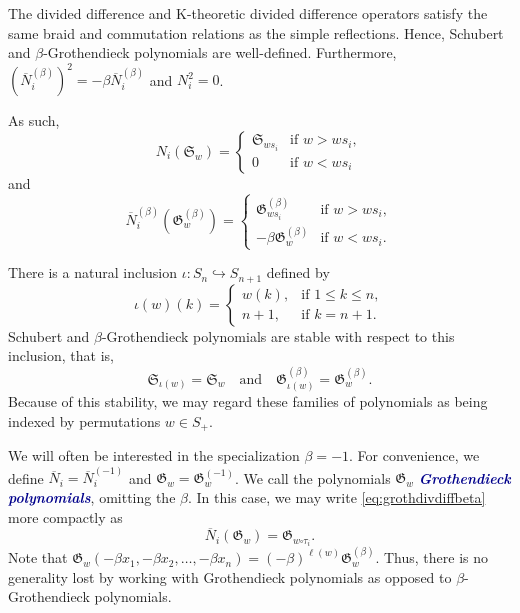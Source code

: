 \documentclass[12 pt]{amsart}
\newcommand{\newword}[1]{\textcolor{darkblue}{\textbf{\emph{#1}}}}
\numberwithin{equation}{section}
\theoremstyle{remark}
\newcommand{\divdiff}{N}
\newcommand{\kdivdiff}{\overline{N}}
\begin{document}
	The divided difference and K-theoretic divided difference operators satisfy the same braid and commutation relations as the simple reflections. 
	Hence, Schubert and $\beta$-Grothendieck polynomials are well-defined. 
	Furthermore, $\left(\kdivdiff_i^{(\beta)}\right)^2 = -\beta \kdivdiff_i^{(\beta)}$ and $\divdiff_i^2 = 0$.
	
	As such,
	\begin{equation}\label{eq:shubdivdiff}
		\divdiff_i(\mathfrak{S}_w) = 
		\begin{cases}
			\mathfrak{S}_{ws_i} &\text{if } w > ws_i, \\
			0 &\text {if } w < ws_i
		\end{cases}
	\end{equation}
	and
	\begin{equation}\label{eq:grothdivdiffbeta}
		\kdivdiff^{(\beta)}_i(\mathfrak{G}^{(\beta)}_w) = 
		\begin{cases}
			\mathfrak{G}^{(\beta)}_{ws_i} &\text{if } w > ws_i, \\
			-\beta \mathfrak{G}^{(\beta)}_{w} &\text {if } w < ws_i.
		\end{cases}
	\end{equation}


	

	
	There is a natural inclusion $\iota:S_n \hookrightarrow S_{n + 1}$ defined by 
	\[
	\iota(w)(k) = 
	\begin{cases}
	w(k), & \text{if } 1 \leq k \leq n, \\
	n + 1, & \text{if } k = n + 1.
	\end{cases}
	\]
	Schubert and $\beta$-Grothendieck polynomials are stable with respect to this inclusion, that is,
	\[
	\mathfrak{S}_{\iota(w)} = \mathfrak{S}_w
	\quad \text{and} \quad
	\mathfrak{G}^{(\beta)}_{\iota(w)} = \mathfrak{G}^{(\beta)}_w.
	\]
	Because of this stability, we may regard these families of polynomials as being indexed by permutations $w \in S_{+}$. 
	
	We will often be interested in the specialization $\beta = -1$. 
	For convenience, we define $\kdivdiff_i = \kdivdiff^{(-1)}_i$ and $\mathfrak{G}_w = \mathfrak{G}^{(-1)}_w$. 
	We call the polynomials $\mathfrak{G}_w$ \newword{Grothendieck polynomials}, omitting the $\beta$.
	In this case, we may write \cref{eq:grothdivdiffbeta} more compactly as
	\begin{equation}\label{eq:grothdivdiff}
		\kdivdiff_i(\mathfrak{G}_w) = \mathfrak{G}_{w \square \tau_i}.
	\end{equation}
	Note that $\mathfrak G_w(-\beta x_1,-\beta x_2,\ldots, -\beta x_n)=(-\beta)^{\ell(w)}\mathfrak{G}_w^{(\beta)}$. Thus, there is no generality lost by working with Grothendieck polynomials as opposed to $\beta$-Grothendieck polynomials.
	
\end{document}
